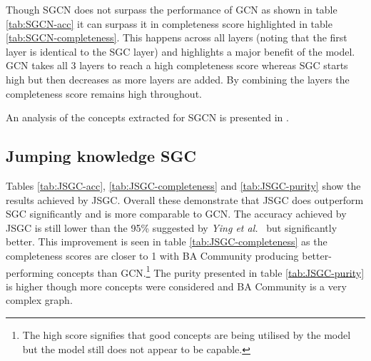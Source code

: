 Though SGCN does not surpass the performance of GCN as shown in table \ref{tab:SGCN-acc} it can surpass it in completeness score highlighted in table \ref{tab:SGCN-completeness}.
This happens across all layers (noting that the first layer is identical to the SGC layer) and highlights a major benefit of the model.
GCN takes all 3 layers to reach a high completeness score whereas SGC starts high but then decreases as more layers are added.
By combining the layers the completeness score remains high throughout.

An analysis of the concepts extracted for SGCN is presented in .

\subsection{Jumping knowledge SGC}
\label{sec:Jump-SGC}







Tables \ref{tab:JSGC-acc}, \ref{tab:JSGC-completeness} and \ref{tab:JSGC-purity} show the results achieved by JSGC.
Overall these demonstrate that JSGC does outperform SGC significantly and is more comparable to GCN.
The accuracy achieved by JSGC is still lower than the 95\% suggested by \textit{Ying et al.}~\cite{ying2019gnnexplainer} but significantly better.
This improvement is seen in table \ref{tab:JSGC-completeness} as the completeness scores are closer to 1 with BA Community producing better-performing concepts than GCN.\footnote{The high score signifies that good concepts are being utilised by the model but the model still does not appear to be capable.}
The purity presented in table \ref{tab:JSGC-purity} is higher though more concepts were considered and BA Community is a very complex graph.

